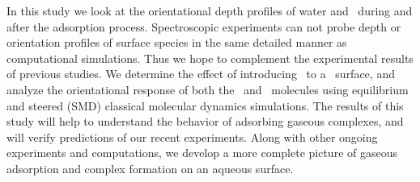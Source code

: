 In this study we look at the orientational depth profiles of water and \suldiox~during and after the adsorption process. Spectroscopic experiments can not probe depth or orientation profiles of surface species in the same detailed manner as computational simulations. Thus we hope to complement the experimental results of previous studies. We determine the effect of introducing \suldiox~to a \wat~surface, and analyze the orientational response of both the \suldiox~and \wat~molecules using equilibrium and steered (SMD) classical molecular dynamics simulations. The results of this study will help to understand the behavior of adsorbing gaseous complexes, and will verify predictions of our recent experiments. Along with other ongoing experiments and computations, we develop a more complete picture of gaseous adsorption and complex formation on an aqueous surface.
